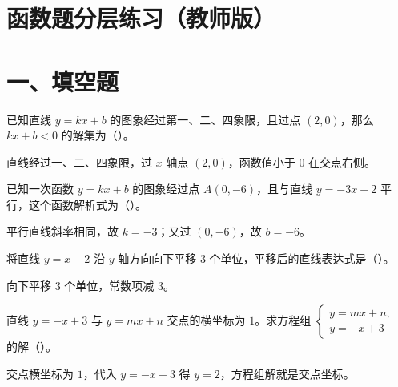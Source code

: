 \documentclass{exam-zh}
\begin{document}
\section*{函数题分层练习（教师版）}

\section*{一、填空题}


\begin{question}[points=4]
  已知直线 $y=kx+b$ 的图象经过第一、二、四象限，且过点 $(2,0)$，那么 $kx+b<0$ 的解集为（\qquad）。
  \paren[$x>2$]
  \begin{solutionblock}
    直线经过一、二、四象限，过 $x$ 轴点 $(2,0)$，函数值小于 $0$ 在交点右侧。
  \end{solutionblock}
\end{question}



\begin{question}[points=4]
  已知一次函数 $y=kx+b$ 的图象经过点 $A(0,-6)$，且与直线 $y=-3x+2$ 平行，这个函数解析式为（\qquad）。
  \paren[$y=-3x-6$]
  \begin{solutionblock}
    平行直线斜率相同，故 $k=-3$；又过 $(0,-6)$，故 $b=-6$。
  \end{solutionblock}
\end{question}



\begin{question}[points=4]
  将直线 $y=x-2$ 沿 $y$ 轴方向向下平移 $3$ 个单位，平移后的直线表达式是（\qquad）。
  \paren[$y=x-5$]
  \begin{solutionblock}
    向下平移 $3$ 个单位，常数项减 $3$。
  \end{solutionblock}
\end{question}



\begin{question}[points=4]
  直线 $y=-x+3$ 与 $y=mx+n$ 交点的横坐标为 $1$。求方程组 $\begin{cases}y=mx+n,\\ y=-x+3\end{cases}$ 的解（\qquad）。
  \paren[$x=1,y=2$]
  \begin{solutionblock}
    交点横坐标为 $1$，代入 $y=-x+3$ 得 $y=2$，方程组解就是交点坐标。
  \end{solutionblock}
\end{question}
\end{document}

